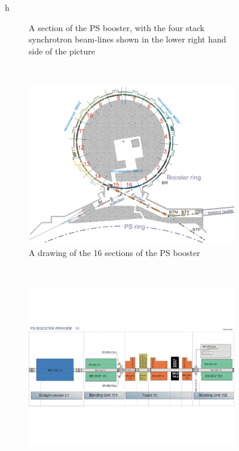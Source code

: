 \begin{figure}{h}
\begin{subfigure}[h]{0.4\textwidth}
        \caption{A section of the PS booster, with the four stack
          synchrotron beam-lines shown in the lower right hand side of
          the picture \cite{LHC:LHC_psbooster_4stacks_image}}\label{fig:psbooster_4stacks}
      \end{subfigure}
       ~ %
      \begin{subfigure}[h]{0.4\textwidth}
        \includegraphics[width=\textwidth]{Figures/LHC_Diagrams/LHC__PSbooster__Layout.pdf}
        \caption{A drawing of the 16 sections of the PS booster \cite{LHC:LHC_psbooster_layout_image}}\label{fig:psbooster_16sections}
      \end{subfigure}
       ~ %
      \begin{subfigure}[h]{0.4\textwidth}
        \includegraphics[width=\textwidth]{Figures/LHC_Diagrams/LHC__PSbooster__sect10.pdf}

\end{subfigure}
\end{figure}
